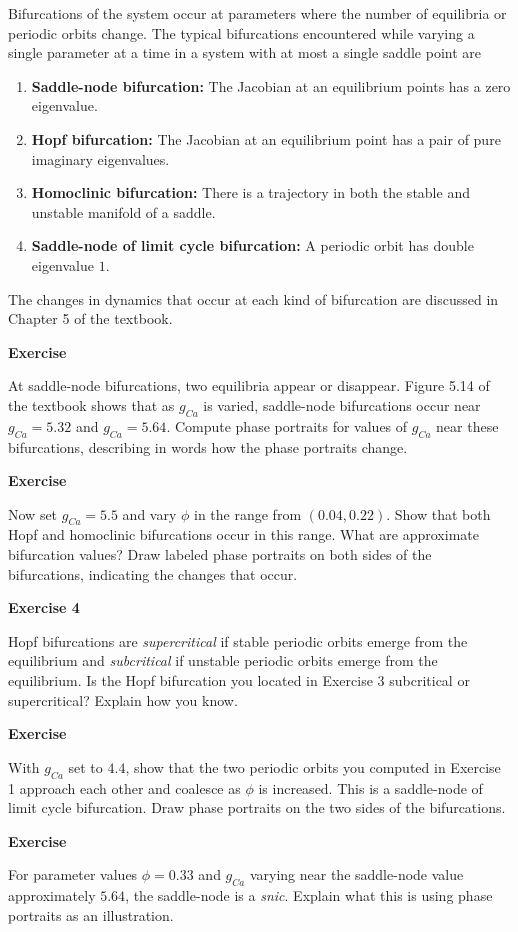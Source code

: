 \documentclass [11pt]{article}
\newcounter{exercise}
\numberwithin{exercise}{section}
\newcommand{\exnumber}{\addtocounter{exercise}{1} \theexercise \thinspace}
\begin{document}
Bifurcations of the system occur at parameters where the number of equilibria or periodic orbits 
change. The typical bifurcations encountered while varying a single parameter at a time in
a system with at most a single saddle point are 
\begin{enumerate}
\item
{\bf Saddle-node bifurcation:} The Jacobian at an equilibrium points 
has a zero eigenvalue.
\item
{\bf Hopf bifurcation:} The Jacobian at an equilibrium point has a pair 
of pure imaginary eigenvalues.
\item
{\bf Homoclinic bifurcation:} There is a trajectory in both the stable 
and unstable manifold of a saddle.
\item
{\bf Saddle-node of limit cycle bifurcation:} A periodic orbit has 
double eigenvalue $1$.
\end{enumerate}
The changes in dynamics that occur at each kind of bifurcation are discussed in
Chapter 5 of the textbook. 

{\bf Exercise \exnumber} At saddle-node bifurcations, two equilibria appear or disappear.
Figure 5.14 of the textbook shows that as $g_{Ca}$ is varied, saddle-node bifurcations 
occur near $g_{Ca} = 5.32$ and $g_{Ca} = 5.64$. Compute phase portraits for values of 
$g_{Ca}$ near these bifurcations, describing in words how the phase portraits change.

{\bf Exercise \exnumber} Now set $g_{Ca} = 5.5$ and vary $\phi$ in the range from $(0.04,0.22)$.
Show that both Hopf and homoclinic bifurcations occur in this range. What are approximate
bifurcation values? Draw labeled phase portraits on both sides of the bifurcations, indicating 
the changes that occur.

{\bf Exercise 4 \exnumber} Hopf bifurcations are {\it supercritical} if stable periodic orbits
emerge from the equilibrium and {\it subcritical} if unstable periodic orbits
emerge from the equilibrium. Is the Hopf bifurcation you located in Exercise 3 subcritical 
or supercritical? Explain how you know.

{\bf Exercise \exnumber} With $g_{Ca}$ set to $4.4$, show that the two periodic orbits you computed
in Exercise 1 approach each other and coalesce as $\phi$ is increased. This is a saddle-node 
of limit cycle bifurcation. Draw phase portraits on the two sides of the bifurcations.

{\bf Exercise \exnumber} For parameter values $\phi = 0.33$ and $g_{Ca}$ varying near the saddle-node
value approximately $5.64$, the saddle-node is a {\it snic}. Explain what this is using 
phase portraits as an illustration.
\end{document}
